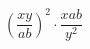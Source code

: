 \begin{ex}
	\begin{condition}
		\( \left(\dfrac{xy}{ab}\right)^2\cdot\dfrac{xab}{y^2} \)
	\end{condition}
\end{ex}